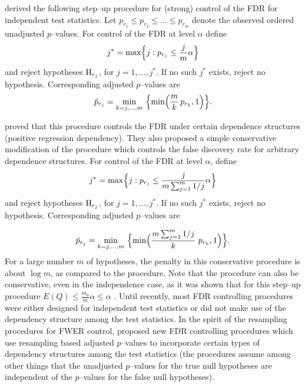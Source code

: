 \documentclass[11pt]{article}
\newcommand{\scst}{\scriptstyle}
\begin{document}
\cite{Benjamini&Hochberg95} derived the following step--up procedure for (strong) control of the FDR for independent test statistics. Let $p_{\scst r_1} \leq p_{\scst r_2} \leq ... \leq p_{\scst r_m}$ denote the observed ordered unadjusted $p$--values. For control of the FDR at level $\alpha$ define 
$$j^* = \max \Bigl\{j: p_{\scst r_j} \leq \frac{j}{m} \alpha \Bigr\}$$
and reject hypotheses ${\rm H}_{\scst r_j}$, for $j=1,\ldots,j^*$. If no such $j^*$ exists, reject no hypothesis. Corresponding adjusted $p$--values are
\begin{equation}\label{eBH}
\tilde{p}_{\scst r_j} = \min_{k = j,\ldots, m}\ \Bigl\{ \min\Bigl(\frac{m}{k} \, p_{\scst r_k}, 1\Bigr) \Bigr\}.
\end{equation}

\cite{Benjamini&Yekutieli01} proved that this procedure controls the FDR under certain dependence structures (positive regression dependency). They also proposed a simple conservative modification of the procedure which controls the false discovery rate for arbitrary dependence structures. For control of the FDR at level $\alpha$, define 
$$ j^* = \max \Bigl\{j: p_{\scst r_j} \leq \frac{j}{m\sum_{j=1}^m 1/j} \alpha \Bigr\}$$ 
and reject hypotheses ${\rm H}_{\scst r_j}$, for $j=1,\ldots,j^*$. If no such $j^*$ exists, reject no hypothesis.  Corresponding adjusted $p$--values are

\begin{equation}\label{eBY}
\tilde{p}_{\scst r_j} = \min_{k = j,\ldots, m}\ \Bigl\{ \min\Bigl (\frac{m \sum_{j=1}^m 1/j}{k} \ p_{\scst r_k}, 1\Bigr) \Bigr\}.
\end{equation}
For a large number $m$ of hypotheses, the penalty in this conservative
procedure is about $\log m$, as compared to the
\cite{Benjamini&Hochberg95} procedure. Note that the
\cite{Benjamini&Hochberg95} procedure can also be conservative,
even in the independence case, as it was shown that for this step--up
procedure $E(Q) \leq \frac{m_0}{m}\alpha \leq \alpha$ . Until recently, most FDR
controlling procedures were either designed for independent test
statistics or did not make use of the dependency structure among
the test statistics. In the spirit of the
\cite{Westfall&Young93} resampling procedures for FWER control,
\cite{Yekutieli&Benjamini99} proposed new FDR controlling
procedures which use resampling based adjusted $p$--values to
incorporate certain types of dependency structures among the test
statistics (the procedures assume among other things that the
unadjusted $p$--values for the true null hypotheses are independent of the $p$--values for the false null hypotheses). \\
\end{document}
